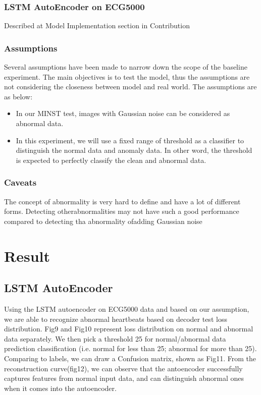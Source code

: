 \documentclass{article}
\begin{document}
\subsubsection{LSTM AutoEncoder on ECG5000}
Described at Model Implementation section in Contribution

\subsubsection{Assumptions}
Several assumptions have been made to narrow down the scope of the baseline experiment. The main objectives is to test the model, thus the assumptions are not considering the closeness between model and real world.
The assumptions are as below:
\begin{itemize}
    \item In our MINST test, images with Gaussian noise can be considered as abnormal data.
    \item In this experiment, we will use a fixed range of threshold as a classifier to distinguish the normal data and anomaly data. In other word, the threshold is expected to perfectly classify the clean and abnormal data. 
\end{itemize}

\subsubsection{Caveats}
The concept of abnormality is very hard to define and have a lot of different forms. Detecting otherabnormalities may not have such a good performance compared to detecting tha abnormality ofadding Gaussian noise



\section{Result}

\subsection{LSTM AutoEncoder}
Using the LSTM autoencoder on ECG5000 data and based on our assumption, we are able to recognize abnormal heartbeats based on decoder test loss distribution. Fig9 and Fig10 represent loss distribution on normal and abnormal data separately. We then pick a threshold 25 for normal/abnormal data prediction classification (i.e. normal for less than 25; abnormal for more than 25). Comparing to labels, we can draw a Confusion matrix, shown as Fig11. From the reconstruction curve(fig12), we can observe that the antoencoder successfully captures features from normal input data, and can distinguish abnormal ones when it comes into the autoencoder.
\end{document}
